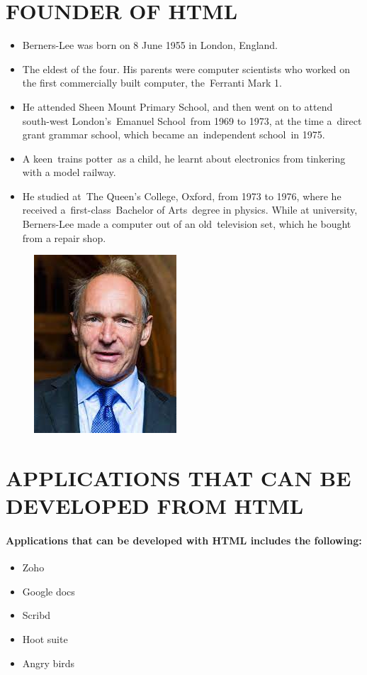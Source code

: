 \documentclass{article}
\begin{document}
	\section*{FOUNDER OF HTML}
	\begin{itemize}
		\item Berners-Lee was born on 8 June 1955 in London, England.
		\item The eldest of the four. His parents were computer scientists who worked on the first commercially built computer, the Ferranti Mark 1.
		\item He attended Sheen Mount Primary School, and then went on to attend south-west London's Emanuel School from 1969 to 1973, at the time a direct grant grammar school, which became an independent school in 1975.
		\item A keen trains potter as a child, he learnt about electronics from tinkering with a model railway.
		\item He studied at The Queen's College, Oxford, from 1973 to 1976, where he received a first-class Bachelor of Arts degree in physics.
		While at university, Berners-Lee made a computer out of an old television set, which he bought from a repair shop.
	\end{itemize}
	\begin{figure}
			\begin{center}
		\includegraphics[width=0.3\linewidth]{tim.jpg}
	\end{center}
	\end{figure}
	\newpage
	\section*{APPLICATIONS THAT CAN BE DEVELOPED FROM HTML}
	\paragraph{Applications that can be developed with HTML includes the following:
	}
	\begin{itemize}
		\item Zoho
		\item Google docs
		\item Scribd
		\item Hoot suite
		\item Angry birds
		
	\end{itemize}
	\newpage
\end{document}

